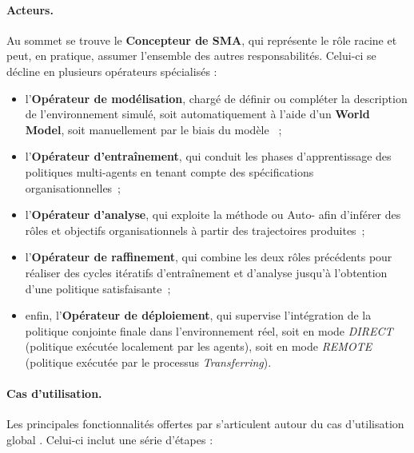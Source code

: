 \paragraph{Acteurs.}
Au sommet se trouve le \textbf{Concepteur de SMA}, qui représente le rôle racine et peut, en pratique, assumer l’ensemble des autres responsabilités. Celui-ci se décline en plusieurs opérateurs spécialisés :
\begin{itemize}
  \item l’\textbf{Opérateur de modélisation}, chargé de définir ou compléter la description de l’environnement simulé, soit automatiquement à l’aide d’un \textbf{World Model}, soit manuellement par le biais du modèle ~;
  \item l’\textbf{Opérateur d’entraînement}, qui conduit les phases d’apprentissage des politiques multi-agents en tenant compte des spécifications organisationnelles~;
  \item l’\textbf{Opérateur d’analyse}, qui exploite la méthode  ou Auto- afin d’inférer des rôles et objectifs organisationnels à partir des trajectoires produites~;
  \item l’\textbf{Opérateur de raffinement}, qui combine les deux rôles précédents pour réaliser des cycles itératifs d’entraînement et d’analyse jusqu’à l’obtention d’une politique satisfaisante~;
  \item enfin, l’\textbf{Opérateur de déploiement}, qui supervise l’intégration de la politique conjointe finale dans l’environnement réel, soit en mode \textit{DIRECT} (politique exécutée localement par les agents), soit en mode \textit{REMOTE} (politique exécutée par le processus \textit{Transferring}).
\end{itemize}

\paragraph{Cas d’utilisation.}
Les principales fonctionnalités offertes par  s’articulent autour du cas d’utilisation global \textbf{}. Celui-ci inclut une série d’étapes :

\medskip

